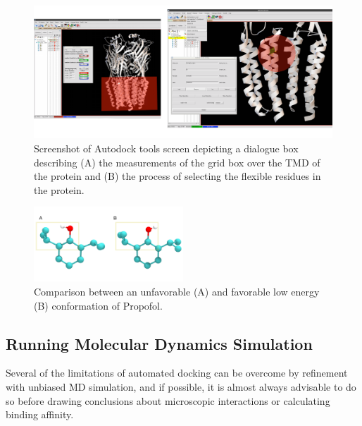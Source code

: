 \documentclass[12pt]{article}
\begin{document}
\begin{figure}
\begin{center}
\centering
\includegraphics[width =  1\textwidth]{finlpics/adt_pic}
\caption{Screenshot of Autodock tools screen  depicting a dialogue box describing (A) the measurements of the grid box over the TMD of the protein and (B) the process of selecting the flexible residues in the protein. }
\label{fig:adtPic}
\end{center}
\end{figure}

\begin{figure}
\begin{center}
\centering
\includegraphics[width =  0.5\textwidth]{finlpics/PFL_dihed}
\caption{Comparison between an unfavorable (A) and favorable low energy (B) conformation of Propofol.}
\label{fig:PFLdihed}
\end{center}
\end{figure}

\subsection{Running Molecular Dynamics Simulation}
\label{sec:unbiasedMD}
Several of the limitations of automated docking can be overcome by refinement with unbiased MD simulation, and if possible, it is almost always advisable to do so before drawing conclusions about microscopic interactions or calculating binding affinity.\hfill \break
\\
\end{document}
